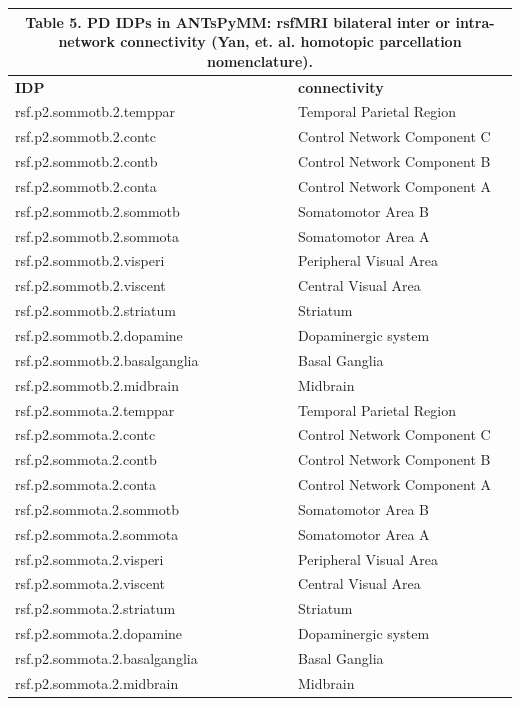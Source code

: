 \documentclass[
  table]{article}
\begin{document}
\begin{small}
\color{black}
\begin{tabular}{ll}
\multicolumn{2}{c}{\begin{minipage}[c]{0.670588235294118\linewidth}Table 5. PD IDPs in ANTsPyMM: rsfMRI bilateral inter or intra-network connectivity  (Yan, et. al. homotopic parcellation nomenclature).\end{minipage}}\\ 
\hline
\textbf{IDP}&\textbf{connectivity}\\ 
\hline
\cellcolor{platinum}rsf.p2.sommotb.2.temppar&\cellcolor{platinum}Temporal Parietal Region\\ 
rsf.p2.sommotb.2.contc&Control Network Component C\\ 
\cellcolor{platinum}rsf.p2.sommotb.2.contb&\cellcolor{platinum}Control Network Component B\\ 
rsf.p2.sommotb.2.conta&Control Network Component A\\ 
\cellcolor{platinum}rsf.p2.sommotb.2.sommotb&\cellcolor{platinum}Somatomotor Area B\\ 
rsf.p2.sommotb.2.sommota&Somatomotor Area A\\ 
\cellcolor{platinum}rsf.p2.sommotb.2.visperi&\cellcolor{platinum}Peripheral Visual Area\\ 
rsf.p2.sommotb.2.viscent&Central Visual Area\\ 
\cellcolor{platinum}rsf.p2.sommotb.2.striatum&\cellcolor{platinum}Striatum\\ 
rsf.p2.sommotb.2.dopamine&Dopaminergic system\\ 
\cellcolor{platinum}rsf.p2.sommotb.2.basalganglia&\cellcolor{platinum}Basal Ganglia\\ 
rsf.p2.sommotb.2.midbrain&Midbrain\\ 
\cellcolor{platinum}rsf.p2.sommota.2.temppar&\cellcolor{platinum}Temporal Parietal Region\\ 
rsf.p2.sommota.2.contc&Control Network Component C\\ 
\cellcolor{platinum}rsf.p2.sommota.2.contb&\cellcolor{platinum}Control Network Component B\\ 
rsf.p2.sommota.2.conta&Control Network Component A\\ 
\cellcolor{platinum}rsf.p2.sommota.2.sommotb&\cellcolor{platinum}Somatomotor Area B\\ 
rsf.p2.sommota.2.sommota&Somatomotor Area A\\ 
\cellcolor{platinum}rsf.p2.sommota.2.visperi&\cellcolor{platinum}Peripheral Visual Area\\ 
rsf.p2.sommota.2.viscent&Central Visual Area\\ 
\cellcolor{platinum}rsf.p2.sommota.2.striatum&\cellcolor{platinum}Striatum\\ 
rsf.p2.sommota.2.dopamine&Dopaminergic system\\ 
\cellcolor{platinum}rsf.p2.sommota.2.basalganglia&\cellcolor{platinum}Basal Ganglia\\ 
rsf.p2.sommota.2.midbrain&Midbrain\\ 
\hline
\end{tabular}
\end{small}
\end{document}
